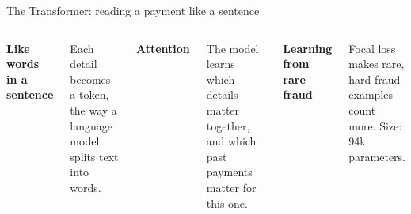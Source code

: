 \documentclass[aspectratio=169,11pt]{beamer}
\newcommand{\point}[2]{%
  {\small\bfseries\color{brand}#1\par}\vspace{0.1em}
  {\footnotesize #2\par}}
\begin{document}
\begin{frame}{The Transformer: reading a payment like a sentence}
  \vspace{0.3em}
  \raggedright
  \begin{columns}[T]
      \point{Like words in a sentence}{Each detail becomes a token, the way a language model
        splits text into words.}
      \point{Attention}{The model learns which details matter together, and which past
        payments matter for this one.}
      \point{Learning from rare fraud}{Focal loss makes rare, hard fraud examples count more.
        Size: 94k parameters.}
  \end{columns}
\end{frame}
\end{document}
